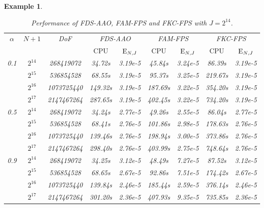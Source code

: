 \documentclass[11pt]{article}%
\numberwithin{equation}{section}
\newtheorem{example}{Example}
\begin{document}
\begin{example}
{		\begin{table}[H]
			\begin{center}
				\caption{Performance of FDS-AAO, FAM-FPS and FKC-FPS with $J=2^{14}$.}\label{csntexpltb}
				\setlength{\tabcolsep}{0.73em}
				\begin{tabular}[c]{ccc|cc|cc|cc}
					\hline
					\multirow{2}{*}{$\alpha$} &\multirow{2}{*}{$N+1$} &\multirow{2}{*}{DoF}&\multicolumn{2}{c|}{FDS-AAO} & \multicolumn{2}{c|}{FAM-FPS}  &\multicolumn{2}{c}{FKC-FPS}\\
					\cline{4-9}
					&&&$\mathrm{CPU}$&${\rm E}_{N,J}$&$\mathrm{CPU}$&${\rm E}_{N,J}$&$\mathrm{CPU}$& ${\rm E}_{N,J}$\\
					\hline
					\multirow{4}{*}{0.1}
					&$2^{14}$ &268419072 &34.72s &3.19e-5 &45.84s           &3.24e-5&86.39s    &3.19e-5\\
					&$2^{15}$ &536854528 &68.55s &3.19e-5 &95.37s           &3.25e-5&219.67s   &3.19e-5\\
					&$2^{16}$ &1073725440&149.32s&3.19e-5 &187.69s          &3.22e-5&354.20s   &3.19e-5\\
					&$2^{17}$ &2147467264&287.65s&3.19e-5 &402.45s          &3.22e-5&734.20s   &3.19e-5\\
					\hline
					\multirow{4}{*}{0.5}
					&$2^{14}$ &268419072 &34.24s &2.77e-5 &49.26s           &2.55e-5&86.04s    &2.77e-5\\
					&$2^{15}$ &536854528 &68.41s &2.76e-5 &101.86s          &2.98e-5&178.63s   &2.76e-5\\
					&$2^{16}$ &1073725440&139.46s&2.76e-5 &198.94s          &3.00e-5&373.86s   &2.76e-5\\
					&$2^{17}$ &2147467264&298.40s&2.76e-5 &403.99s          &2.75e-5&748.64s   &2.76e-5\\
					\hline
					\multirow{4}{*}{0.9}
					&$2^{14}$ &268419072 &34.25s &3.12e-5 &48.49s           &7.27e-5&87.52s    &3.12e-5\\
					&$2^{15}$ &536854528 &68.65s &2.67e-5 &92.86s           &7.51e-5&174.42s   &2.67e-5\\
					&$2^{16}$ &1073725440&139.84s&2.46e-5 &185.44s          &2.59e-5&376.14s   &2.46e-5\\
					&$2^{17}$ &2147467264&301.20s&2.36e-5 &407.93s          &9.35e-5&735.85s   &2.36e-5\\
					\hline
				\end{tabular}
			\end{center}
		\end{table}
		
	}
\end{example}
\end{document}
